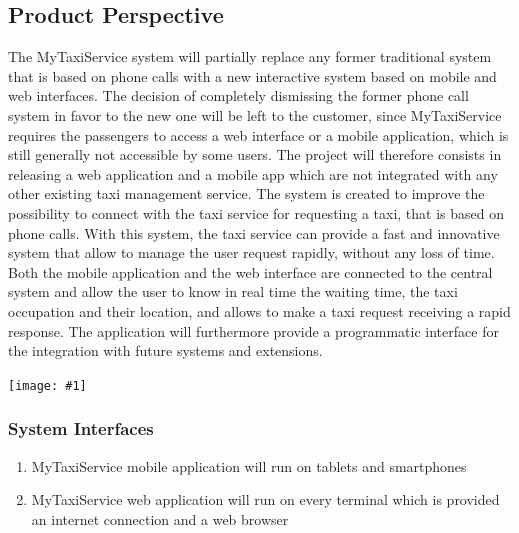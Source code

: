 \documentclass[11pt, a4paper,titlepage]{article}
\newcommand{\productname}{MyTaxiService }
\newcommand{\image}[1]{
	\begin{center}
		\noindent \texttt{[image: \#1]}
	\end{center}
	}
\begin{document}
\subsection{Product Perspective}
The \productname system will partially replace any former traditional system that is based on phone calls with a new interactive system based on mobile and web interfaces. \newline
The decision of completely dismissing the former phone call system in favor to the new one will be left to the customer, since \productname requires the passengers to access a web interface or a mobile application, which is still generally not accessible by some users.
\newline
The project will therefore consists in releasing a web application and a mobile app which are not integrated with any other existing taxi management service.
The system is created to improve the possibility to connect with the taxi service for requesting a taxi, that is based on phone calls.
With this system, the taxi service can provide a fast and innovative system that allow to manage the user request rapidly, without any loss of time.
Both the mobile application and the web interface are connected to the central system and allow the user to know in real time the waiting time, the taxi occupation and their location, and allows to make a taxi request receiving a rapid response.
The application will furthermore provide a programmatic interface for the integration with future systems and extensions.
\newline

	\image{perspective_schema.png}

\pagebreak
\subsubsection{System Interfaces}
	\begin{enumerate}
		\item \productname mobile application will run on tablets and smartphones
		\item \productname web application will run on every terminal which is provided an internet connection and a web browser
	\end{enumerate}
\end{document}
